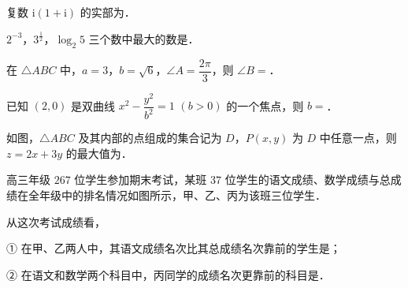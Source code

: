 \begin{question}
复数 \(\mathrm{i}(1+\mathrm{i})\) 的实部为\gkblank{}．

\end{question}
\begin{question}
\(2^{-3}\)，\(3^{\frac{1}{2}}\)，\(\log_{2}5\) 三个数中最大的数是\gkblank{}．

\end{question}
\begin{question}
在 \(\triangle ABC\) 中，\(a=3\)，\(b=\sqrt{6}\)，\(\angle A=\dfrac{2\pi}{3}\)，则 \(\angle B=\)\gkblank{}．

\end{question}
\begin{question}
已知 \((2,0)\) 是双曲线 \(x^{2}-\dfrac{y^{2}}{b^{2}}=1\) \((b>0)\) 的一个焦点，则 \(b=\)\gkblank{}．

\Needspace{0.4\textheight}
\end{question}
\begin{question}
如图，\(\triangle ABC\) 及其内部的点组成的集合记为 \(D\)，\(P(x,y)\) 为 \(D\) 中任意一点，则 \(z=2x+3y\) 的最大值为\gkblank{}．
\nopagebreak[4]
\begin{center}\end{center}
\nopagebreak[4]
\Needspace{0.4\textheight}
\end{question}
\begin{question}
高三年级 \(267\) 位学生参加期末考试，某班 \(37\) 位学生的语文成绩、数学成绩与总成绩在全年级中的排名情况如图所示，甲、乙、丙为该班三位学生．
\nopagebreak[4]
\begin{center}\end{center}
\nopagebreak[4]
从这次考试成绩看，

① 在甲、乙两人中，其语文成绩名次比其总成绩名次靠前的学生是\gkblank{}；

② 在语文和数学两个科目中，丙同学的成绩名次更靠前的科目是\gkblank{}．

\end{question}

